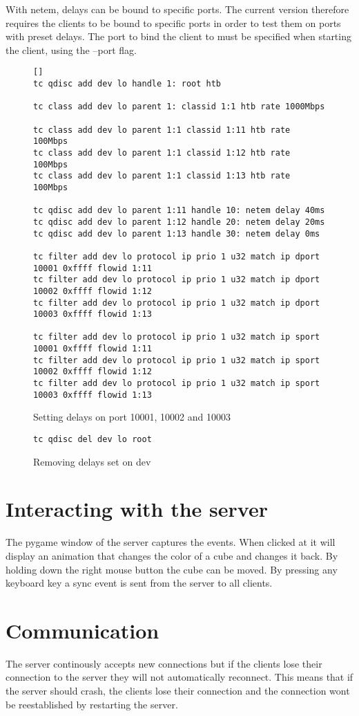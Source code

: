 With netem, delays can be bound to specific ports. The current version therefore requires the clients to be bound to specific ports in order to test them on ports with preset delays. The port to bind the client to must be specified when starting the client, using the --port flag. 

\begin{figure}[h! ]
\begin{verbatim}[]
tc qdisc add dev lo handle 1: root htb

tc class add dev lo parent 1: classid 1:1 htb rate 1000Mbps

tc class add dev lo parent 1:1 classid 1:11 htb rate 100Mbps
tc class add dev lo parent 1:1 classid 1:12 htb rate 100Mbps
tc class add dev lo parent 1:1 classid 1:13 htb rate 100Mbps

tc qdisc add dev lo parent 1:11 handle 10: netem delay 40ms
tc qdisc add dev lo parent 1:12 handle 20: netem delay 20ms
tc qdisc add dev lo parent 1:13 handle 30: netem delay 0ms

tc filter add dev lo protocol ip prio 1 u32 match ip dport 10001 0xffff flowid 1:11
tc filter add dev lo protocol ip prio 1 u32 match ip dport 10002 0xffff flowid 1:12
tc filter add dev lo protocol ip prio 1 u32 match ip dport 10003 0xffff flowid 1:13

tc filter add dev lo protocol ip prio 1 u32 match ip sport 10001 0xffff flowid 1:11
tc filter add dev lo protocol ip prio 1 u32 match ip sport 10002 0xffff flowid 1:12
tc filter add dev lo protocol ip prio 1 u32 match ip sport 10003 0xffff flowid 1:13
\end{verbatim}
\caption{Setting delays on port 10001, 10002 and 10003}
\end{figure}

\begin{figure}[h!]
\begin{verbatim}
tc qdisc del dev lo root
\end{verbatim}
\caption{Removing delays set on dev}
\end{figure}

\section{Interacting with the server}
The pygame window of the server captures the events. When clicked at it will display an animation that changes the color of a cube and changes it back. By holding down the right mouse button the cube can be moved. By pressing any keyboard key a sync event is sent from the server to all clients. 

\section{Communication}
The server continously accepts new connections but if the clients lose their connection to the server they will not automatically reconnect. This means that if the server should crash, the clients lose their connection and the connection wont be reestablished by restarting the server.

